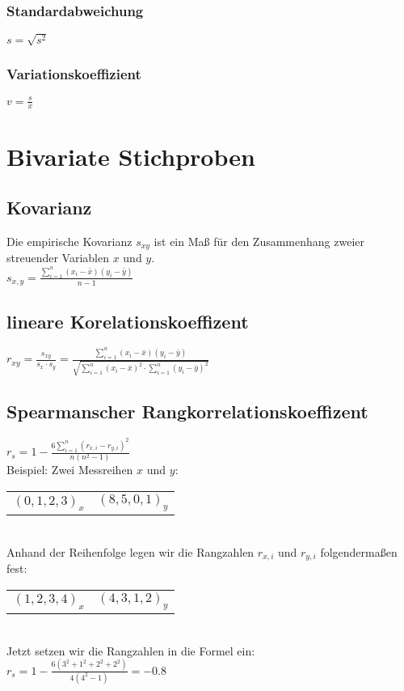\documentclass[a4paper, 11pt]{article}
\begin{document}
\subsubsection{Standardabweichung}
$s=\sqrt{s^2}$
\subsubsection{Variationskoeffizient}
$v=\frac{s}{\bar{x}}$
\section{Bivariate Stichproben}
\subsection{Kovarianz}
Die empirische Kovarianz $s_{xy}$ ist ein Maß für den Zusammenhang
zweier streuender Variablen $x$ und $y$. \\
\newline
$s_{x,y}=\frac{\sum\nolimits_{i=1}^{n}(x_i - \bar{x})(y_i - \bar{y})}{n-1}$
\subsection{lineare Korelationskoeffizent}
$r_{xy} = \frac{s_{xy}}{s_{x}\cdot s_{y}} =
\frac{\sum\nolimits_{i=1}^{n}(x_i-\bar{x})(y_i-\bar{y})}{\sqrt{\sum\nolimits_{i=1}^{n}(x_i-\bar{x})^2
\cdot \sum\nolimits_{i=1}^{n}(y_i-\bar{y})^2}}$
\subsection{Spearmanscher Rangkorrelationskoeffizent}
$r_s = 1-\frac{6\sum\nolimits_{i=1}^{n}(r_{x,i}-r_{y,i})^2}{n(n^2-1)}$ \\
\newline
Beispiel: Zwei Messreihen $x$ und $y$: \\
\begin{tabular}{l r}
$(0,1,2,3)_x $ & $(8,5,0,1)_y $ \\
\end{tabular} \\
Anhand der Reihenfolge legen wir die Rangzahlen $r_{x,i}$ und $r_{y,i}$
folgendermaßen fest: \\
\begin{tabular}{l r}
$(1,2,3,4)_x $ & $(4,3,1,2)_y $ \\
\end{tabular} \\
Jetzt setzen wir die Rangzahlen in die Formel ein: \\
$r_s = 1-\frac{6(3^2+1^2+2^2+2^2)}{4(4^2-1)} = -0.8$
\newpage
\end{document}
